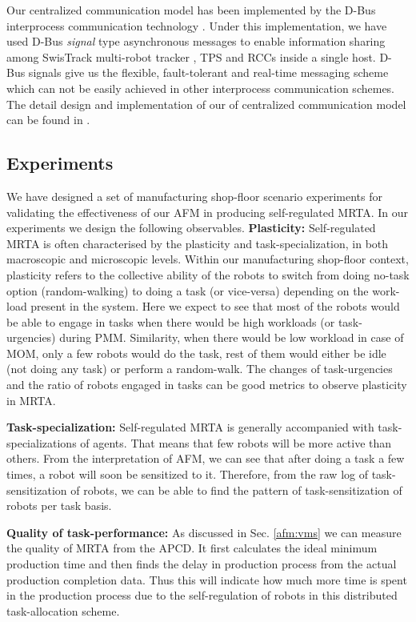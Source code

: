 \documentclass{intech}
\begin{document}
Our centralized communication model has been implemented by the D-Bus interprocess communication technology \cite{Pennington+2010}. Under this implementation, we have used D-Bus \textit{signal} type asynchronous messages to enable information sharing among SwisTrack multi-robot tracker \cite{Lochmatter+2008}, TPS and RCCs inside a single host. D-Bus signals give us the flexible, fault-tolerant and real-time messaging scheme which can not be easily achieved in other interprocess communication schemes. The detail design and implementation  of our of centralized communication model can be found in \cite{Sarker2010control}. 
\subsection{Experiments}
We have designed a set of  manufacturing shop-floor scenario experiments for validating the effectiveness of our AFM in producing self-regulated MRTA. In our experiments we design the following observables.
\textbf{Plasticity:} %
Self-regulated MRTA is often characterised by the plasticity and task-specialization, in both macroscopic and microscopic levels. Within our manufacturing shop-floor context, plasticity refers to the collective ability of the robots to switch from doing no-task option (random-walking) to doing a task (or vice-versa) depending on the work-load present in the system. Here we expect to see that most of the robots would be able to engage in tasks when there would be high workloads (or task-urgencies) during PMM. Similarity, when there would be low workload in case of MOM, only a few robots would do the task, rest of them would either be idle (not doing any task) or perform a random-walk.  The changes of task-urgencies and the ratio of robots engaged in tasks can be good metrics to observe plasticity in MRTA.

\textbf{Task-specialization:} Self-regulated MRTA is generally accompanied with task-specializations of agents. That means that few robots will be more active than others. From the interpretation of AFM, we can see that after doing a task a few times, a robot will soon be sensitized to it. Therefore, from the raw log of task-sensitization of robots, we can be able to find the pattern of task-sensitization of robots per task basis.

\textbf{Quality of task-performance:} As discussed in Sec. \ref{afm:vms} we can measure the quality of MRTA from the APCD. It first calculates the ideal minimum production time and then finds the delay in production process from the actual production completion data. Thus this will indicate how much more time is  spent in the production process due to the self-regulation of robots in this distributed task-allocation scheme.
\end{document}
